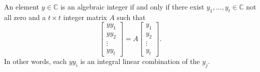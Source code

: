 \begin{prop} \label{prop:characalgint}
	An element $y \in \mathbb{C}$ is an algebraic integer if and only if there exist $y_1, \ldots, y_t \in \mathbb{C}$ not all zero and a $t \times t$ integer matrix $A$ such that
	\begin{equation*} 
		\begin{bmatrix}
			yy_1\\
			yy_2\\
			\vdots\\
			yy_t
		\end{bmatrix} = A\begin{bmatrix}
			y_1\\
			y_2\\
			\vdots\\
			y_t
		\end{bmatrix}.
	\end{equation*}
	In other words, each $yy_i$ is an integral linear combination of the $y_j.$
\end{prop}
